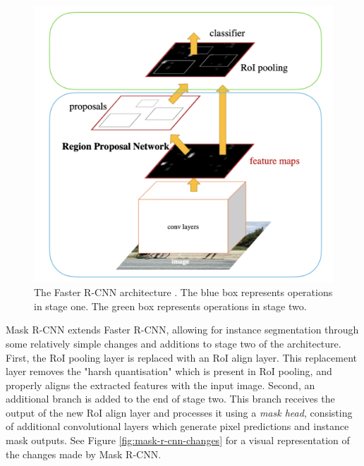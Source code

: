 \begin{figure}
	\begin{center}
		\includegraphics[scale=0.3]{Chapter2/figs/faster-r-cnn-architecture.png}
	\end{center}
	\caption{The Faster R-CNN architecture \cite{ren_faster_2015}. The blue box represents operations in stage one. The green box represents operations in stage two.}
	\label{fig:faster-r-cnn-architecture}
\end{figure}


Mask R-CNN extends Faster R-CNN, allowing for instance segmentation through some relatively simple changes and additions to stage two of the architecture. First, the RoI pooling layer is replaced with an RoI align layer. This replacement layer removes the "harsh quantisation" which is present in RoI pooling, and properly aligns the extracted features with the input image. Second, an additional branch is added to the end of stage two. This branch receives the output of the new RoI align layer and processes it using a \textit{mask head}, consisting of additional convolutional layers which generate pixel predictions and instance mask outputs. See Figure \ref{fig:mask-r-cnn-changes} for a visual representation of the changes made by Mask R-CNN.  


